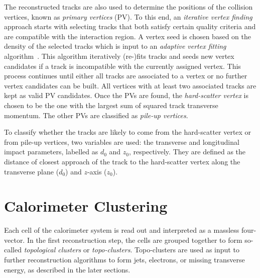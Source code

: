 The reconstructed tracks are also used to determine the positions of the collision vertices, known as \emph{primary vertices} (PV). To this end, an \emph{iterative vertex finding} approach \cite{PERF-2015-01} starts with selecting tracks that both satisfy certain quality criteria and are compatible with the interaction region. A vertex seed is chosen based on the density of the selected tracks which is input to an \emph{adaptive vertex fitting} algorithm~\cite{0954-3899-34-12-N01}.
This algorithm iteratively (re-)fits tracks and seeds new vertex candidates if a track is incompatible with the currently assigned vertex.
This process continues until either all tracks are associated to a vertex or no further vertex candidates can be built.
All vertices with at least two associated tracks are kept as valid PV candidates.
Once the PVs are found, the \emph{hard-scatter vertex} is chosen to be the one with the largest sum of squared track transverse momentum. The other PVs are classified as \emph{pile-up vertices}.

To classify whether the tracks are likely to come from the hard-scatter vertex or from pile-up vertices, two variables are used: the transverse and longitudinal impact parameters, labelled as $d_0$ and $z_0$, respectively. They are defined as the distance of closest approach of the track to the hard-scatter vertex along the transverse plane ($d_0$) and $z$-axis ($z_0$).




\section{Calorimeter Clustering}
\label{sec:calo-clustering}
Each cell of the calorimeter system is read out and interpreted as a massless four-vector. In the first reconstruction step, the cells are grouped together to form so-called \emph{topological clusters} or \emph{topo-clusters}. Topo-clusters are used as input to further reconstruction algorithms to form jets, electrons, or missing transverse energy, as described in the later sections.

